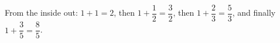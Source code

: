 From the inside out: $1+1=2$, then $1+\dfrac12=\dfrac32$, then $1+\dfrac23=\dfrac53$, and finally $1+\dfrac35=\boxed{\dfrac85}$.
